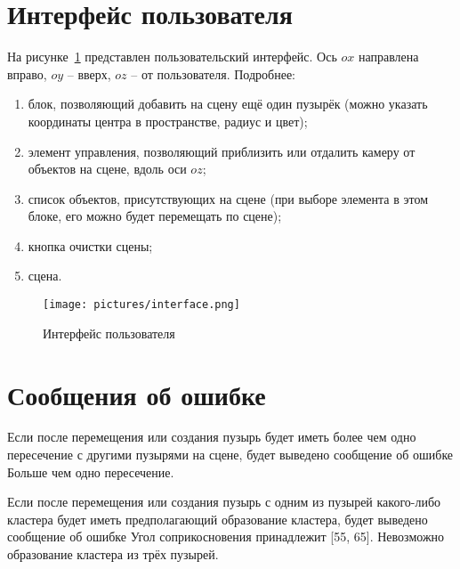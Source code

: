 \section{Интерфейс пользователя}
На рисунке~\ref{fig:interface} представлен пользовательский интерфейс. Ось $ox$ направлена вправо, $oy$ -- вверх, $oz$ -- от пользователя. Подробнее:
\begin{enumerate}[label={\arabic*)}]
	\item блок, позволяющий добавить на сцену ещё один пузырёк (можно указать координаты центра в пространстве, радиус и цвет);
	\item элемент управления, позволяющий приблизить или отдалить камеру от объектов на сцене, вдоль оси $oz$;
	\item список объектов, присутствующих на сцене (при выборе элемента в этом блоке, его можно будет перемещать по сцене);
	\item кнопка очистки сцены;
	\item сцена.  
	
\end{enumerate}
\begin{figure}[h]
	\centering
	\texttt{[image: pictures/interface.png]}
	\caption{Интерфейс пользователя}
	\label{fig:interface}
\end{figure}

\section{Сообщения об ошибке}

Если после перемещения или создания пузырь будет иметь более чем одно пересечение с другими пузырями на сцене, будет выведено сообщение об ошибке \guillemotleft Больше чем одно пересечение\guillemotright.

Если после перемещения или создания пузырь с одним из пузырей какого-либо кластера будет иметь предполагающий образование кластера, будет выведено сообщение об ошибке \guillemotleft Угол соприкосновения принадлежит [55, 65]. Невозможно образование кластера из трёх пузырей\guillemotright.

